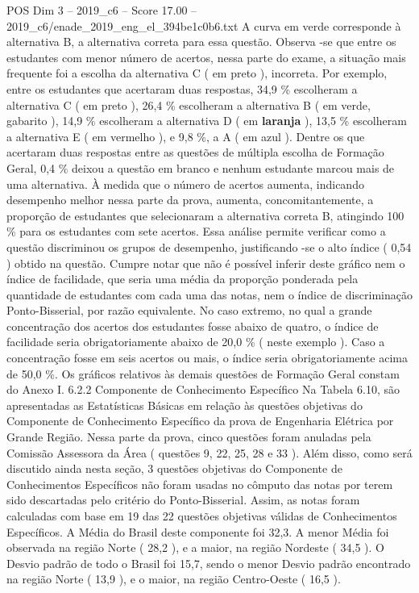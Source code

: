 \begin{textsample}{POS Dim 3 – 2019\_c6 – Score 17.00 – 2019\_c6/enade\_2019\_eng\_el\_394be1c0b6.txt}
A curva em verde corresponde à alternativa B, a alternativa correta para essa questão.
Observa -se que entre os estudantes com menor número de acertos, nessa parte do exame, a situação mais frequente foi a escolha da alternativa C ( em preto ), incorreta.
Por exemplo, entre os estudantes que acertaram duas respostas, 34,9 \% escolheram a alternativa C ( em preto ), 26,4 \% escolheram a alternativa B ( em verde, gabarito ), 14,9 \% escolheram a alternativa D ( em \textbf{laranja} ), 13,5 \% escolheram a alternativa E ( em vermelho ), e 9,8 \%, a A ( em azul ).
Dentre os que acertaram duas respostas entre as questões de múltipla escolha de Formação Geral, 0,4 \% deixou a questão em branco e nenhum estudante marcou mais de uma alternativa.
À medida que o número de acertos aumenta, indicando desempenho melhor nessa parte da prova, aumenta, concomitantemente, a proporção de estudantes que selecionaram a alternativa correta B, atingindo 100 \% para os estudantes com sete acertos.
Essa análise permite verificar como a questão discriminou os grupos de desempenho, justificando -se o alto índice ( 0,54 ) obtido na questão.
Cumpre notar que não é possível inferir deste gráfico nem o índice de facilidade, que seria uma média da proporção ponderada pela quantidade de estudantes com cada uma das notas, nem o índice de discriminação Ponto-Bisserial, por razão equivalente.
No caso extremo, no qual a grande concentração dos acertos dos estudantes fosse abaixo de quatro, o índice de facilidade seria obrigatoriamente abaixo de 20,0 \% ( neste exemplo ).
Caso a concentração fosse em seis acertos ou mais, o índice seria obrigatoriamente acima de 50,0 \%.
Os gráficos relativos às demais questões de Formação Geral constam do Anexo I. 6.2.2 Componente de Conhecimento Específico Na Tabela 6.10, são apresentadas as Estatísticas Básicas em relação às questões objetivas do Componente de Conhecimento Específico da prova de Engenharia Elétrica por Grande Região.
Nessa parte da prova, cinco questões foram anuladas pela Comissão Assessora da Área ( questões 9, 22, 25, 28 e 33 ).
Além disso, como será discutido ainda nesta seção, 3 questões objetivas do Componente de Conhecimentos Específicos não foram usadas no cômputo das notas por terem sido descartadas pelo critério do Ponto-Bisserial.
Assim, as notas foram calculadas com base em 19 das 22 questões objetivas válidas de Conhecimentos Específicos.
A Média do Brasil deste componente foi 32,3.
A menor Média foi observada na região Norte ( 28,2 ), e a maior, na região Nordeste ( 34,5 ).
O Desvio padrão de todo o Brasil foi 15,7, sendo o menor Desvio padrão encontrado na região Norte ( 13,9 ), e o maior, na região Centro-Oeste ( 16,5 ).

\end{textsample}
